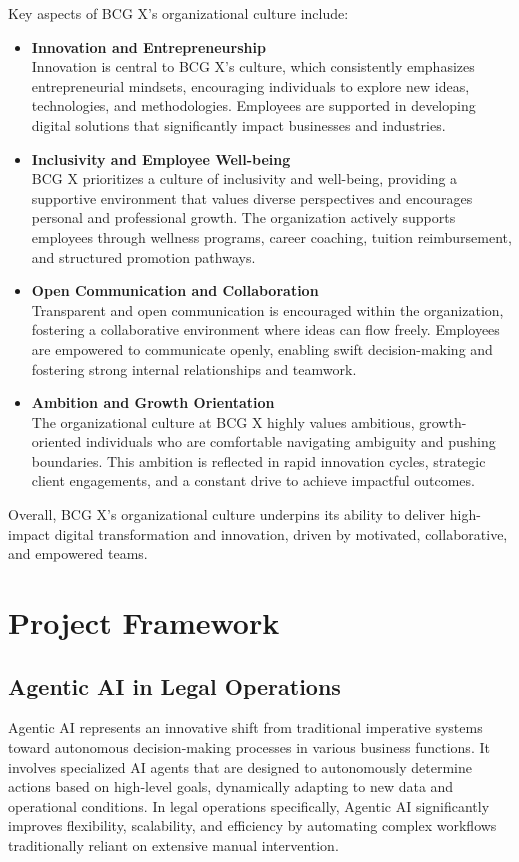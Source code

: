 Key aspects of BCG X’s organizational culture include:
\begin{itemize}
    \item \textbf{Innovation and Entrepreneurship }\\
        Innovation is central to BCG X's culture, which consistently emphasizes entrepreneurial mindsets, encouraging individuals to explore new ideas, technologies, and methodologies. Employees are supported in developing digital solutions that significantly impact businesses and industries.
    \item \textbf{Inclusivity and Employee Well-being }\\
        BCG X prioritizes a culture of inclusivity and well-being, providing a supportive environment that values diverse perspectives and encourages personal and professional growth. The organization actively supports employees through wellness programs, career coaching, tuition reimbursement, and structured promotion pathways.
    \item \textbf{Open Communication and Collaboration }\\
        Transparent and open communication is encouraged within the organization, fostering a collaborative environment where ideas can flow freely. Employees are empowered to communicate openly, enabling swift decision-making and fostering strong internal relationships and teamwork.
    \item \textbf{Ambition and Growth Orientation }\\
        The organizational culture at BCG X highly values ambitious, growth-oriented individuals who are comfortable navigating ambiguity and pushing boundaries. This ambition is reflected in rapid innovation cycles, strategic client engagements, and a constant drive to achieve impactful outcomes.
\end{itemize}

Overall, BCG X’s organizational culture underpins its ability to deliver high-impact digital transformation and innovation, driven by motivated, collaborative, and empowered teams.


\section{Project Framework}


\subsection{Agentic AI in Legal Operations}
Agentic AI represents an innovative shift from traditional imperative systems toward autonomous decision-making processes in various business functions. It involves specialized AI agents that are designed to autonomously determine actions based on high-level goals, dynamically adapting to new data and operational conditions. In legal operations specifically, Agentic AI significantly improves flexibility, scalability, and efficiency by automating complex workflows traditionally reliant on extensive manual intervention.\mynewline

